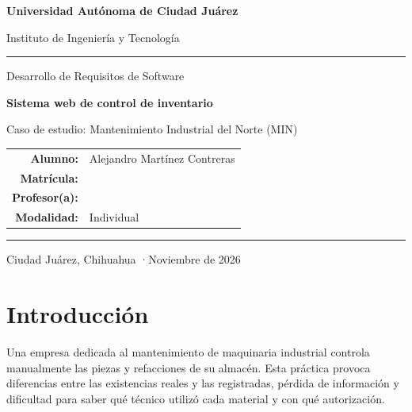 \documentclass[12pt,letterpaper]{article}
\begin{document}
\begin{titlepage}
  \centering
  {\large\bfseries Universidad Autónoma de Ciudad Juárez\par}
  {\normalsize Instituto de Ingeniería y Tecnología\par}
  \vspace{0.4cm}
  {\color{azul}\rule{\linewidth}{1.2pt}}\par
  \vspace{2.2cm}
  {\Large Desarrollo de Requisitos de Software\par}
  \vspace{1.2cm}
  {\color{azul}\Huge\bfseries Sistema web de control de inventario\par}
  \vspace{0.4cm}
  {\Large Caso de estudio: Mantenimiento Industrial del Norte (MIN)\par}
  \vspace{2.4cm}
  \begin{tabular}{rl}
    \textbf{Alumno:} & Alejandro Martínez Contreras \\
    \textbf{Matrícula:} & \underline{\hspace{4cm}} \\
    \textbf{Profesor(a):} & \underline{\hspace{4cm}} \\
    \textbf{Modalidad:} & Individual \\
  \end{tabular}
  \vfill
  {\color{azul}\rule{\linewidth}{1.2pt}}\par
  {\large Ciudad Juárez, Chihuahua \quad·\quad Noviembre de 2026\par}
\end{titlepage}

\tableofcontents
\clearpage

\section{Introducción}

Una empresa dedicada al mantenimiento de maquinaria industrial controla manualmente las piezas y refacciones de su almacén. Esta práctica provoca diferencias entre las existencias reales y las registradas, pérdida de información y dificultad para saber qué técnico utilizó cada material y con qué autorización.
\end{document}
